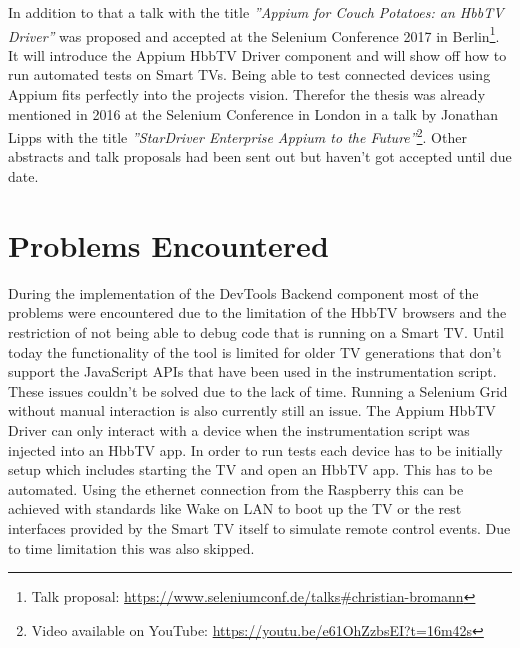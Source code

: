 In addition to that a talk with the title \textit{''Appium for Couch Potatoes: an HbbTV Driver''} was proposed and accepted at the Selenium Conference 2017 in Berlin\footnote{Talk proposal: \url{https://www.seleniumconf.de/talks\#christian-bromann}}. It will introduce the Appium HbbTV Driver component and will show off how to run automated tests on Smart TVs. Being able to test connected devices using Appium fits perfectly into the projects vision. Therefor the thesis was already mentioned in 2016 at the Selenium Conference in London in a talk by Jonathan Lipps with the title \textit{''StarDriver Enterprise Appium to the Future''}\footnote{Video available on YouTube: \url{https://youtu.be/e61OhZzbsEI?t=16m42s}}. Other abstracts and talk proposals had been sent out but haven't got accepted until due date.

\section{Problems Encountered\label{sec:problems}}


During the implementation of the DevTools Backend component most of the problems were encountered due to the limitation of the HbbTV browsers and the restriction of not being able to debug code that is running on a Smart TV. Until today the functionality of the tool is limited for older TV generations that don't support the JavaScript APIs that have been used in the instrumentation script. These issues couldn't be solved due to the lack of time. Running a Selenium Grid without manual interaction is also currently still an issue. The Appium HbbTV Driver can only interact with a device when the instrumentation script was injected into an HbbTV app. In order to run tests each device has to be initially setup which includes starting the TV and open an HbbTV app. This has to be automated. Using the ethernet connection from the Raspberry this can be achieved with standards like Wake on LAN to boot up the TV or the rest interfaces provided by the Smart TV itself to simulate remote control events. Due to time limitation this was also skipped.

